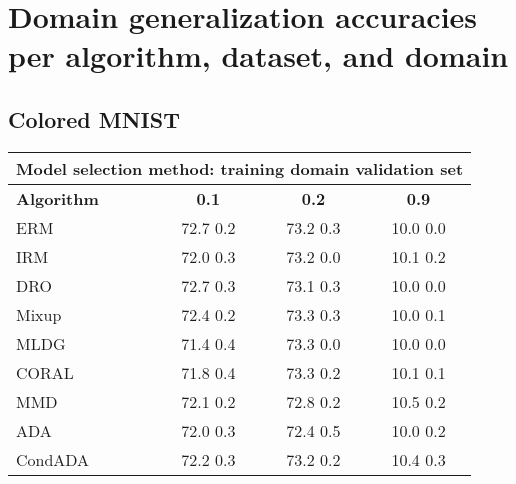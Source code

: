 \documentclass{article}
\begin{document}
\clearpage
\newpage
\section{Domain generalization accuracies per algorithm, dataset, and domain}
\label{app:full_results}
\subsection{Colored MNIST}
\begin{center}
\begin{tabular}{lccc}
\toprule
\multicolumn{4}{c}{\textbf{Model selection method: training domain validation set}} \\
\midrule
\textbf{Algorithm}    & \textbf{0.1}              & \textbf{0.2}              & \textbf{0.9}              \\
\midrule
ERM                       & 72.7  0.2            & 73.2  0.3            & 10.0  0.0            \\
IRM                       & 72.0  0.3            & 73.2  0.0            & 10.1  0.2            \\
DRO                 & 72.7  0.3            & 73.1  0.3            & 10.0  0.0            \\
Mixup                     & 72.4  0.2            & 73.3  0.3            & 10.0  0.1            \\
MLDG                      & 71.4  0.4            & 73.3  0.0            & 10.0  0.0            \\
CORAL                     & 71.8  0.4            & 73.3  0.2            & 10.1  0.1            \\
MMD                       & 72.1  0.2            & 72.8  0.2            & 10.5  0.2            \\
ADA                       & 72.0  0.3            & 72.4  0.5            & 10.0  0.2            \\
CondADA                   & 72.2  0.3            & 73.2  0.2            & 10.4  0.3            \\
\bottomrule
\end{tabular}
\end{center}
\end{document}
